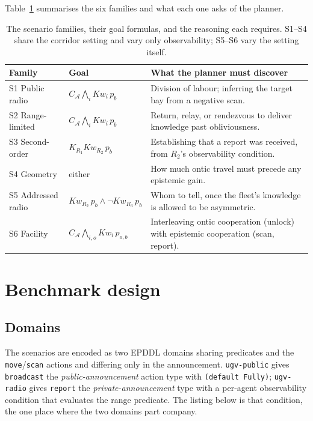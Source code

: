 \documentclass[11pt,a4paper]{article}
\theoremstyle{definition}
\newcommand{\Ag}{\mathcal{A}}
\newcommand{\Kop}[1]{K_{#1}}
\newcommand{\Kw}[1]{\mathit{Kw}_{#1}}
\newcommand{\Cop}[1]{C_{#1}}
\begin{document}
\smallskip
Table~\ref{tab:scenarios} summarises the six families and what each one asks
of the planner.

\begin{table}[H]
\centering
\small
\caption{The scenario families, their goal formulas, and the reasoning each
requires. S1--S4 share the corridor setting and vary only observability;
S5--S6 vary the setting itself.}
\label{tab:scenarios}
\begin{tabularx}{\textwidth}{@{}l l >{\raggedright\arraybackslash}X@{}}
\toprule
\textbf{Family} & \textbf{Goal} & \textbf{What the planner must discover} \\
\midrule
S1 Public radio & $\Cop{\Ag}\bigwedge_{i}\Kw{i}\,p_b$ &
Division of labour; inferring the target bay from a negative scan. \\
S2 Range-limited & $\Cop{\Ag}\bigwedge_{i}\Kw{i}\,p_b$ &
Return, relay, or rendezvous to deliver knowledge past obliviousness. \\
S3 Second-order & $\Kop{R_1}\Kw{R_2}\,p_b$ &
Establishing that a report was received, from $R_2$'s observability condition. \\
S4 Geometry & either & How much ontic travel must precede any epistemic gain. \\
\addlinespace
S5 Addressed radio & $\Kw{R_2}\,p_b \wedge \neg\Kw{R_3}\,p_b$ &
Whom to tell, once the fleet's knowledge is allowed to be asymmetric. \\
S6 Facility & $\Cop{\Ag}\bigwedge_{i,o}\Kw{i}\,p_{o,b}$ &
Interleaving ontic cooperation (unlock) with epistemic cooperation (scan, report). \\
\bottomrule
\end{tabularx}
\end{table}

\section{Benchmark design}
\label{sec:bench}

\subsection{Domains}

The scenarios are encoded as two EPDDL domains sharing predicates and the
\texttt{move}/\texttt{scan} actions and differing only in the announcement.
\texttt{ugv-public} gives \texttt{broadcast} the \emph{public-announcement}
action type with \texttt{(default Fully)}; \texttt{ugv-radio} gives
\texttt{report} the \emph{private-announcement} type with a per-agent
observability condition that evaluates the range predicate. The listing below
is that condition, the one place where the two domains part company.
\end{document}

